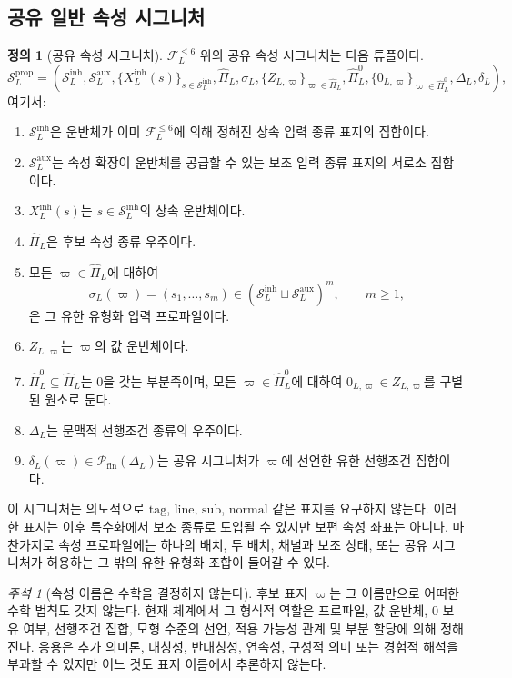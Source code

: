 \documentclass[11pt]{article}
\newcommand{\FVI}{\mathcal F_{L}^{\le 6}}
\newcommand{\Sin}{\mathcal S_{L}^{\mathrm{inh}}}
\newcommand{\Saux}{\mathcal S_{L}^{\mathrm{aux}}}
\newcommand{\Sprop}{\mathcal S_{L}^{\mathrm{prop}}}
\newcommand{\Pihat}{\widehat{\Pi}_{L}}
\newcommand{\PiZero}{\widehat{\Pi}_{L}^{0}}
\newcommand{\Dep}{\Delta_{L}}
\newcommand{\Pfin}{\mathcal P_{\mathrm{fin}}}
\theoremstyle{definition}
\newtheorem{definition}[theorem]{정의}
\theoremstyle{remark}
\newtheorem{remark}[theorem]{주석}
\begin{document}
\subsection{공유 일반 속성 시그니처}

\begin{definition}[공유 속성 시그니처]
\label{def:signature}
\(\FVI\) 위의 공유 속성 시그니처는 다음 튜플이다.
\[
\Sprop=
\left(
\Sin,\Saux,
\{X_L^{\mathrm{inh}}(s)\}_{s\in\Sin},
\Pihat,\sigma_L,
\{Z_{L,\varpi}\}_{\varpi\in\Pihat},
\PiZero,\{0_{L,\varpi}\}_{\varpi\in\PiZero},
\Dep,\delta_L
\right),
\]
여기서:
\begin{enumerate}[label=(\arabic*)]
\item \(\Sin\)은 운반체가 이미 \(\FVI\)에 의해 정해진 상속 입력 종류 표지의 집합이다.
\item \(\Saux\)는 속성 확장이 운반체를 공급할 수 있는 보조 입력 종류 표지의 서로소 집합이다.
\item \(X_L^{\mathrm{inh}}(s)\)는 \(s\in\Sin\)의 상속 운반체이다.
\item \(\Pihat\)은 후보 속성 종류 우주이다.
\item 모든 \(\varpi\in\Pihat\)에 대하여
\[
\sigma_L(\varpi)=(s_1,\ldots,s_m)\in(\Sin\sqcup\Saux)^m,
\qquad m\ge 1,
\]
은 그 유한 유형화 입력 프로파일이다.
\item \(Z_{L,\varpi}\)는 \(\varpi\)의 값 운반체이다.
\item \(\PiZero\subseteq\Pihat\)는 0을 갖는 부분족이며, 모든 \(\varpi\in\PiZero\)에 대하여 \(0_{L,\varpi}\in Z_{L,\varpi}\)를 구별된 원소로 둔다.
\item \(\Dep\)는 문맥적 선행조건 종류의 우주이다.
\item \(\delta_L(\varpi)\in\Pfin(\Dep)\)는 공유 시그니처가 \(\varpi\)에 선언한 유한 선행조건 집합이다.
\end{enumerate}
\end{definition}

이 시그니처는 의도적으로 \(\mathrm{tag}\), \(\mathrm{line}\), \(\mathrm{sub}\), \(\mathrm{normal}\) 같은 표지를 요구하지 않는다.
이러한 표지는 이후 특수화에서 보조 종류로 도입될 수 있지만 보편 속성 좌표는 아니다.
마찬가지로 속성 프로파일에는 하나의 배치, 두 배치, 채널과 보조 상태, 또는 공유 시그니처가 허용하는 그 밖의 유한 유형화 조합이 들어갈 수 있다.

\begin{remark}[속성 이름은 수학을 결정하지 않는다]
후보 표지 \(\varpi\)는 그 이름만으로 어떠한 수학 법칙도 갖지 않는다.
현재 체계에서 그 형식적 역할은 프로파일, 값 운반체, 0 보유 여부, 선행조건 집합, 모형 수준의 선언, 적용 가능성 관계 및 부분 할당에 의해 정해진다.
응용은 추가 의미론, 대칭성, 반대칭성, 연속성, 구성적 의미 또는 경험적 해석을 부과할 수 있지만 어느 것도 표지 이름에서 추론하지 않는다.
\end{remark}
\end{document}
